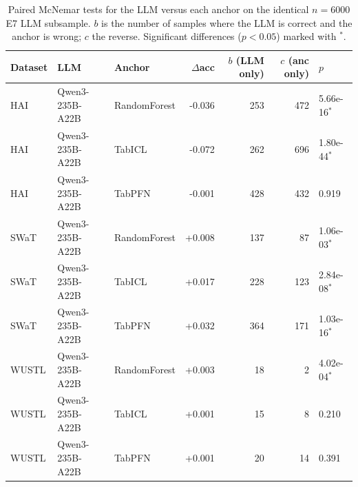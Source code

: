 \begin{table}[t]
\centering
\caption{Paired McNemar tests for the LLM versus each anchor on the identical $n=6000$ E7 LLM subsample. $b$ is the number of samples where the LLM is correct and the anchor is wrong; $c$ the reverse. Significant differences ($p<0.05$) marked with $^{*}$.}
\label{tab:mcnemar}
\small
\begin{tabular}{lllrrrl}
\toprule
Dataset & LLM & Anchor & $\Delta$acc & $b$ (LLM only) & $c$ (anc only) & $p$ \\
\midrule
HAI & Qwen3-235B-A22B & RandomForest & -0.036 & 253 & 472 & 5.66e-16$^{*}$ \\
HAI & Qwen3-235B-A22B & TabICL & -0.072 & 262 & 696 & 1.80e-44$^{*}$ \\
HAI & Qwen3-235B-A22B & TabPFN & -0.001 & 428 & 432 & 0.919 \\
\midrule
SWaT & Qwen3-235B-A22B & RandomForest & +0.008 & 137 & 87 & 1.06e-03$^{*}$ \\
SWaT & Qwen3-235B-A22B & TabICL & +0.017 & 228 & 123 & 2.84e-08$^{*}$ \\
SWaT & Qwen3-235B-A22B & TabPFN & +0.032 & 364 & 171 & 1.03e-16$^{*}$ \\
\midrule
WUSTL & Qwen3-235B-A22B & RandomForest & +0.003 & 18 & 2 & 4.02e-04$^{*}$ \\
WUSTL & Qwen3-235B-A22B & TabICL & +0.001 & 15 & 8 & 0.210 \\
WUSTL & Qwen3-235B-A22B & TabPFN & +0.001 & 20 & 14 & 0.391 \\
\bottomrule
\end{tabular}
\end{table}
